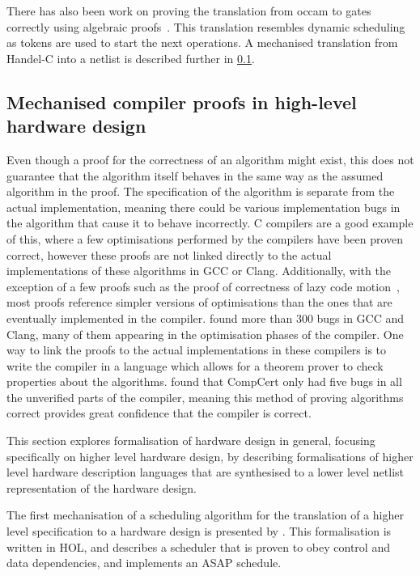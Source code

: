 There has also been work on proving the translation from occam to
gates~\cite{page91_compil_occam} correctly using algebraic
proofs~\cite{jifeng93_towar}.  This translation resembles dynamic scheduling as
tokens are used to start the next operations.  A mechanised translation from
Handel-C into a netlist is described further in
\cref{sec:bg:mechanised-compiler-proofs}.

\subsection{Mechanised compiler proofs in high-level hardware design}%
\label{sec:bg:mechanised-compiler-proofs}

Even though a proof for the correctness of an algorithm might exist, this does
not guarantee that the algorithm itself behaves in the same way as the assumed
algorithm in the proof.  The specification of the algorithm is separate from
the actual implementation, meaning there could be various implementation bugs in
the algorithm that cause it to behave incorrectly.  C compilers are a good
example of this, where a few optimisations performed by the compilers have been
proven correct, however these proofs are not linked directly to the actual
implementations of these algorithms in GCC or Clang.
Additionally, with the exception of a few proofs such as the proof of correctness of lazy code motion~\cite{knoop94_ocm}, most proofs reference simpler versions of optimisations than the ones that are eventually implemented in the compiler.
\textcite{yang11_findin_under_bugs_c_compil} found more than 300 bugs in GCC and
Clang, many of them appearing in the optimisation phases of the compiler.  One
way to link the proofs to the actual implementations in these compilers is to
write the compiler in a language which allows for a theorem prover to check
properties about the algorithms.  \citeauthor{yang11_findin_under_bugs_c_compil}
found that CompCert only had five bugs in all the unverified parts of the
compiler, meaning this method of proving algorithms correct provides great
confidence that the compiler is correct.

This section explores formalisation of hardware design in general, focusing
specifically on higher level hardware design, by describing formalisations of
higher level hardware description languages that are synthesised to a lower
level netlist representation of the hardware design.

The first mechanisation of a scheduling algorithm for the translation of a
higher level specification to a hardware design is presented by
\textcite{anderson94_vsa}.  This formalisation is written in HOL, and describes
a scheduler that is proven to obey control and data dependencies, and implements
an ASAP schedule.

